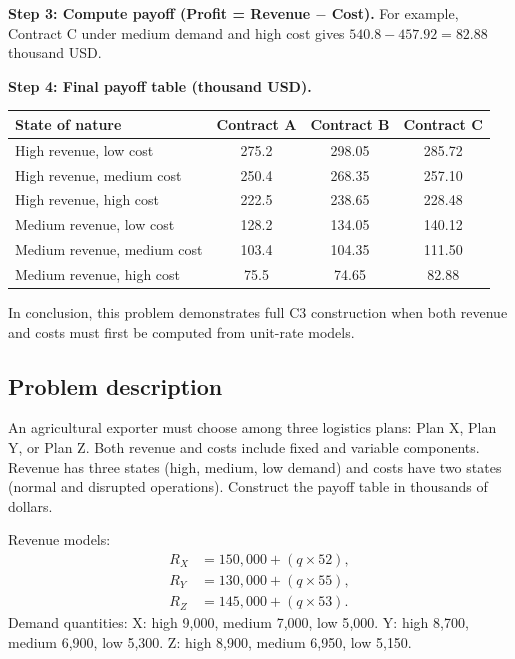 \begin{ExamProblems}
		\textbf{Step 3: Compute payoff (Profit = Revenue $-$ Cost).}
		For example, Contract C under medium demand and high cost gives
		\(540.8-457.92=82.88\) thousand USD.
		
		\textbf{Step 4: Final payoff table (thousand USD).}
		\begin{center}
			\begin{tabular}{l c c c}
				\toprule
				State of nature & Contract A & Contract B & Contract C \\
				\midrule
				High revenue, low cost & 275.2 & 298.05 & 285.72 \\
				High revenue, medium cost & 250.4 & 268.35 & 257.10 \\
				High revenue, high cost & 222.5 & 238.65 & 228.48 \\
				Medium revenue, low cost & 128.2 & 134.05 & 140.12 \\
				Medium revenue, medium cost & 103.4 & 104.35 & 111.50 \\
				Medium revenue, high cost & 75.5 & 74.65 & 82.88 \\
				\bottomrule
			\end{tabular}
		\end{center}
		
		In conclusion, this problem demonstrates full C3 construction when both revenue and costs must first be computed from unit-rate models.
		
		\item
		\subsection*{Problem description}
		An agricultural exporter must choose among three logistics plans: Plan X, Plan Y, or Plan Z.
		Both revenue and costs include fixed and variable components.
		Revenue has three states (high, medium, low demand) and costs have two states (normal and disrupted operations).
		Construct the payoff table in thousands of dollars.
		
		Revenue models:
		\[
		\begin{aligned}
		R_X &= 150{,}000 + (q\times52),\\
		R_Y &= 130{,}000 + (q\times55),\\
		R_Z &= 145{,}000 + (q\times53).
		\end{aligned}
		\]
		Demand quantities:
		X: high 9{,}000, medium 7{,}000, low 5{,}000.
		Y: high 8{,}700, medium 6{,}900, low 5{,}300.
		Z: high 8{,}900, medium 6{,}950, low 5{,}150.
		

\end{ExamProblems}
